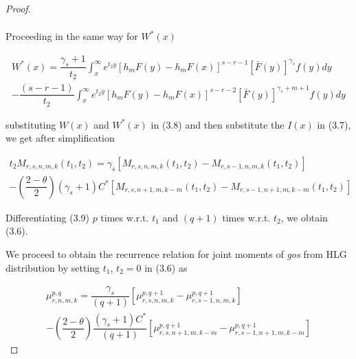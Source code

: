\documentclass[11pt,a4paper]{article}
\numberwithin{equation}{section}
\begin{document}
\begin{proof}
\begin{eqnarray}
		\end{eqnarray}

		Proceeding in the same way for $W^{*}(x)$

		\begin{eqnarray}

			W^{*}(x)= \dfrac{\gamma_{s}+1}{t_{2}}\int_{x}^{\infty}e^{t_{2}y}\left[h_{m} F\left(y\right)-h_{m} F\left(x\right)\right]^{s-r-1}\left[\bar{F}\left(y\right)\right]^{\gamma _{s}}f(y)dy\nonumber\\

			-\dfrac{(s-r-1)}{t_{2}}\int_{x}^{\infty}e^{t_{2}y}\left[h_{m} F\left(y\right)-h_{m} F\left(x\right)\right]^{s-r-2}\left[\bar{F}\left(y\right)\right]^{\gamma _{s}+m+1}f(y)dy\nonumber

		\end{eqnarray}

		substituting $W(x)$ and $W^{*}(x)$ in (3.8) and then substitute the $I(x)$ in (3.7), we get after simplification 

		\begin{eqnarray}

			t_{2}M_{r,s,n,m,k}(t_{1},t_{2})={\gamma_{s}}\left[M_{r,s,n,m,k}(t_{1},t_{2})-M_{r,s-1,n,m,k}(t_{1},t_{2})\right]\nonumber\\

			-\left(\dfrac{2-\theta}{2}\right){\left(\gamma_{s}+1\right)C^{*}}\left[M_{r,s,n+1,m,k-m}(t_{1},t_{2})-M_{r,s-1,n+1,m,k-m}(t_{1},t_{2})\right]

		\end{eqnarray}

		Differentiating (3.9) $p$ times w.r.t. $t_{1}$ and $(q+1)$ times w.r.t. $t_{2}$, we obtain (3.6).

		We proceed to obtain the recurrence relation for joint moments of \textit{gos} from HLG distribution by setting $t_{1}$, $t_{2}=0$ in (3.6) as

		\begin{eqnarray}

			\mu_{r,n,m,k}^{p,q}=\dfrac{\gamma_{s}}{(q+1)}\left[\mu_{r,s,n,m,k}^{p,q+1}-\mu_{r,s-1,n,m,k}^{p,q+1}\right]\nonumber \\

		-\left(\dfrac{2-\theta}{2}\right)\dfrac{(\gamma_{s}+1)C^{*}}{(q+1)}\left[\mu_{r,s,n+1,m,k-m}^{p,q+1}-\mu_{r,s-1,n+1,m,k-m}^{p,q+1}\right]

		\end{eqnarray}

	\end{proof}
\end{document}
